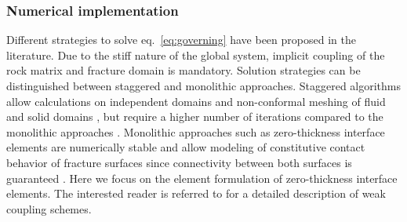 \subsubsection*{Numerical implementation}
Different strategies to solve eq.~\eqref{eq:governing} have been proposed in the literature. Due to the stiff nature of the global system, implicit coupling of the rock matrix and fracture domain is mandatory. Solution strategies can be distinguished between staggered and monolithic approaches. Staggered algorithms allow calculations on independent domains and non-conformal meshing of fluid and solid domains \cite{Girault2016}, but require a higher number of iterations compared to the monolithic approaches \cite{schmidt2019}. Monolithic approaches such as zero-thickness interface elements are numerically stable and allow modeling of constitutive contact behavior of fracture surfaces since connectivity between both surfaces is guaranteed \cite{segura2008coupledII}. Here we focus on the element formulation of zero-thickness interface elements. The interested reader is referred to \cite{Girault2015,Girault2016,schmidt2019} for a detailed description of weak coupling schemes.


